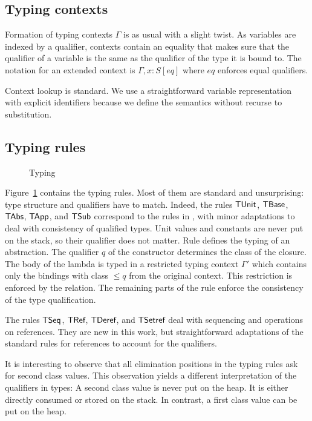 \documentclass[sigplan,review,dvipsnames,screen,10pt]{acmart}
\begin{document}
\subsection{Typing contexts}
\label{sec:typing-contexts}

Formation of typing contexts $\Gamma$ is as usual with a slight
twist. As variables are indexed by a qualifier, contexts contain an
equality that makes sure that the qualifier of a variable is the same
as the qualifier of the type it is bound to. The notation for an
extended context is $\Gamma, x:S[eq]$ where $eq$ enforces equal qualifiers.
\Contexts

Context lookup is standard. We use a straightforward variable
representation with explicit identifiers because we define the
semantics without recurse to substitution.
\ContextLookup

\subsection{Typing rules}
\label{sec:typing-rules}
\begin{figure}[tp]
  \TypingRules  
  \caption{Typing}
  \label{fig:typing}
\end{figure}
Figure~\ref{fig:typing} contains the typing rules. Most of them are
standard and unsurprising: type structure and qualifiers have to
match. Indeed, the rules $\ACTUnit$, $\ACTBase$, $\ACTAbs$, $\ACTApp$,
and $\ACTSub$ correspond to the rules in
\citet{DBLP:conf/ecoop/XhebrajB0R22}, with minor adaptations to deal
with consistency of qualified types.
Unit values and constants are never put on the stack, so their
qualifier does not matter. Rule {\ACTAbs} defines the typing of an
abstraction. The qualifier $q$ of the {\AClam} constructor determines
the class of the closure. The body of the lambda is typed in a
restricted typing context $\Gamma'$ which contains only the
bindings with class $\le q$ from the original context. This
restriction is enforced by the {\AqBounded} relation. The remaining
parts of the rule enforce the consistency of the type
qualification.

The rules $\ACTSeq$, $\ACTRef$, $\ACTDeref$, and $\ACTSetref$ deal
with sequencing and operations on references. They are new in this
work, but straightforward adaptations of the standard rules for
references to account for the qualifiers.

It is interesting to observe that all elimination positions in the
typing rules ask for second class values. This observation yields a
different interpretation of the qualifiers in types: A second class
value is never put on the heap. It is either directly consumed or
stored on the stack. In contrast, a first class value can be put on
the heap.
\end{document}
